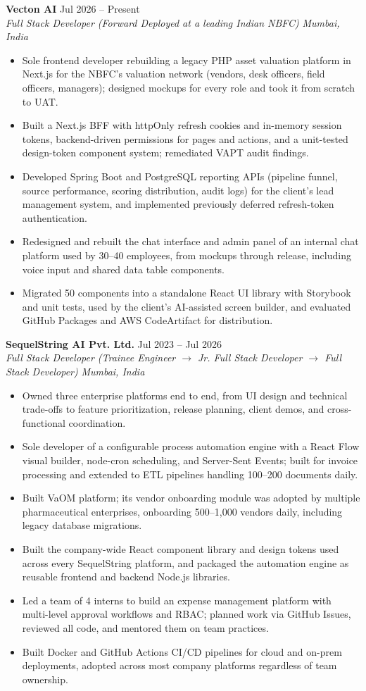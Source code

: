 \documentclass[a4paper,10pt]{article}
\newcommand{\subheading}[4]{
    \textbf{#1} \hfill #2 \\
    \textit{#3} \hfill \textit{#4} \\
}
\begin{document}
\subheading
{Vecton AI}{Jul 2026 -- Present}
{Full Stack Developer \quad (Forward Deployed at a leading Indian NBFC)}{Mumbai, India}
\begin{itemize}
    \item Sole frontend developer rebuilding a legacy PHP asset valuation platform in Next.js for the NBFC's valuation network (vendors, desk officers, field officers, managers); designed mockups for every role and took it from scratch to UAT.
    \item Built a Next.js BFF with httpOnly refresh cookies and in-memory session tokens, backend-driven permissions for pages and actions, and a unit-tested design-token component system; remediated VAPT audit findings.
    \item Developed Spring Boot and PostgreSQL reporting APIs (pipeline funnel, source performance, scoring distribution, audit logs) for the client's lead management system, and implemented previously deferred refresh-token authentication.
    \item Redesigned and rebuilt the chat interface and admin panel of an internal chat platform used by 30--40 employees, from mockups through release, including voice input and shared data table components.
    \item Migrated 50 components into a standalone React UI library with Storybook and unit tests, used by the client's AI-assisted screen builder, and evaluated GitHub Packages and AWS CodeArtifact for distribution.
\end{itemize}

\subheading
{SequelString AI Pvt. Ltd.}{Jul 2023 -- Jul 2026}
{Full Stack Developer \quad (Trainee Engineer $\rightarrow$ Jr. Full Stack Developer $\rightarrow$ Full Stack Developer)}{Mumbai, India}
\begin{itemize}
    \item Owned three enterprise platforms end to end, from UI design and technical trade-offs to feature prioritization, release planning, client demos, and cross-functional coordination.
    \item Sole developer of a configurable process automation engine with a React Flow visual builder, node-cron scheduling, and Server-Sent Events; built for invoice processing and extended to ETL pipelines handling 100--200 documents daily.
    \item Built VaOM platform; its vendor onboarding module was adopted by multiple pharmaceutical enterprises, onboarding 500--1,000 vendors daily, including legacy database migrations.
    \item Built the company-wide React component library and design tokens used across every SequelString platform, and packaged the automation engine as reusable frontend and backend Node.js libraries.
    \item Led a team of 4 interns to build an expense management platform with multi-level approval workflows and RBAC; planned work via GitHub Issues, reviewed all code, and mentored them on team practices.
    \item Built Docker and GitHub Actions CI/CD pipelines for cloud and on-prem deployments, adopted across most company platforms regardless of team ownership.
\end{itemize}
\end{document}
